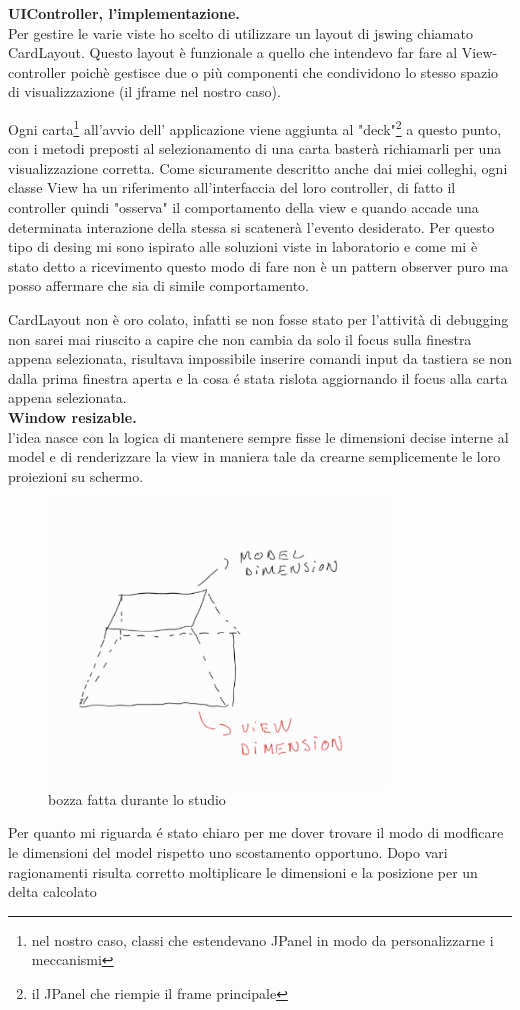 \documentclass[a4paper,12pt]{report}
\begin{document}
\textbf{UIController, l'implementazione.}\\
Per gestire le varie viste ho scelto di utilizzare un layout di jswing chiamato CardLayout.
Questo layout è funzionale a quello che intendevo far fare al View-controller poichè
gestisce due o più componenti che condividono lo stesso spazio di visualizzazione (il jframe nel nostro caso).

Ogni carta\footnote{nel nostro caso, classi che estendevano JPanel in modo da personalizzarne i meccanismi}
all'avvio dell' applicazione viene aggiunta al "deck"\footnote{il JPanel che riempie il frame principale}
a questo punto, con i metodi preposti al selezionamento di una carta basterà richiamarli per una visualizzazione
corretta.
Come sicuramente descritto anche dai miei colleghi, ogni classe View ha un riferimento all'interfaccia
del loro controller, di fatto il controller quindi "osserva" il comportamento della view e quando accade una
determinata interazione della stessa si scatenerà l'evento desiderato.
Per questo tipo di desing mi sono ispirato alle soluzioni viste in laboratorio e come mi è stato detto
a ricevimento questo modo di fare non è un pattern observer puro ma posso affermare che sia di simile
comportamento.

CardLayout non è oro colato, infatti se non fosse stato per l'attività di debugging non sarei mai riuscito
a capire che non cambia da solo il focus sulla finestra appena selezionata, risultava impossibile
inserire comandi input da tastiera se non dalla prima finestra aperta e la cosa é stata rislota
aggiornando il focus alla carta appena selezionata.\\

\textbf{Window resizable.}\\

l'idea nasce con la logica di mantenere sempre fisse le dimensioni decise interne al model
e di renderizzare la view in maniera tale da crearne semplicemente le loro proiezioni su schermo.
\begin{figure}[H]
    \centering
    \includegraphics[width=0.8\textwidth]{images/projection.jpg}
    \caption{bozza fatta durante lo studio}
\end{figure}
Per quanto mi riguarda é stato chiaro per me dover trovare il modo di modficare le dimensioni del model rispetto
uno scostamento opportuno.
Dopo vari ragionamenti risulta corretto moltiplicare le dimensioni e la posizione per un delta calcolato
\end{document}

